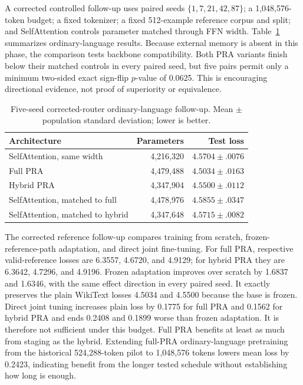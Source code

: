 \documentclass[11pt]{article}
\begin{document}
A corrected controlled follow-up uses paired seeds $\{1,7,21,42,87\}$; a 1,048,576-token budget; a fixed tokenizer; a fixed 512-example reference corpus and split; and SelfAttention controls parameter matched through FFN width. Table~\ref{tab:position-followup} summarizes ordinary-language results. Because external memory is absent in this phase, the comparison tests backbone compatibility. Both PRA variants finish below their matched controls in every paired seed, but five pairs permit only a minimum two-sided exact sign-flip $p$-value of 0.0625. This is encouraging directional evidence, not proof of superiority or equivalence.

\begin{table}[ht]
\centering
\caption{Five-seed corrected-router ordinary-language follow-up. Mean $\pm$ population standard deviation; lower is better.}
\label{tab:position-followup}
\begin{tabular}{lrr}
\toprule
Architecture & Parameters & Test loss \\
\midrule
SelfAttention, same width & 4,216,320 & $4.5704\pm.0076$ \\
Full PRA & 4,479,488 & $4.5034\pm.0163$ \\
Hybrid PRA & 4,347,904 & $4.5500\pm.0112$ \\
SelfAttention, matched to full & 4,478,976 & $4.5855\pm.0347$ \\
SelfAttention, matched to hybrid & 4,347,648 & $4.5715\pm.0082$ \\
\bottomrule
\end{tabular}
\end{table}

The corrected reference follow-up compares training from scratch, frozen-reference-path adaptation, and direct joint fine-tuning. For full PRA, respective valid-reference losses are 6.3557, 4.6720, and 4.9129; for hybrid PRA they are 6.3642, 4.7296, and 4.9196. Frozen adaptation improves over scratch by 1.6837 and 1.6346, with the same effect direction in every paired seed. It exactly preserves the plain WikiText losses 4.5034 and 4.5500 because the base is frozen. Direct joint tuning increases plain loss by 0.1775 for full PRA and 0.1562 for hybrid PRA and ends 0.2408 and 0.1899 worse than frozen adaptation. It is therefore not sufficient under this budget. Full PRA benefits at least as much from staging as the hybrid. Extending full-PRA ordinary-language pretraining from the historical 524,288-token pilot to 1,048,576 tokens lowers mean loss by 0.2423, indicating benefit from the longer tested schedule without establishing how long is enough.
\end{document}
